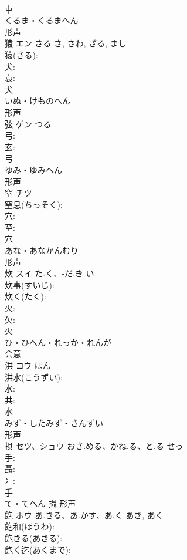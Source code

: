 \documentclass[8pt]{extreport}
\begin{document}
\begin{CJK}{UTF8}{min}
\\	車	
\\	くるま・くるまへん	
\\	形声 
\\	猿	エン	さる	さ, さわ, ざる, まし	
\\	猿(さる): 
\\	犬: 
\\	袁: 
\\	犬	
\\	いぬ・けものへん	
\\	形声 
\\	弦	ゲン	つる		
\\	弓: 
\\	玄: 
\\	弓	
\\	ゆみ・ゆみへん	
\\	形声 
\\	窒	チツ			
\\	窒息(ちっそく): 
\\	穴: 
\\	至: 
\\	穴	
\\	あな・あなかんむり	
\\	形声 
\\	炊	スイ	た.く、-だ.き	い	
\\	炊事(すいじ): 
\\	炊く(たく): 
\\	火: 
\\	欠: 
\\	火	
\\	ひ・ひへん・れっか・れんが	
\\	会意 
\\	洪	コウ		ほん	
\\	洪水(こうずい): 
\\	水: 
\\	共: 
\\	水	
\\	みず・したみず・さんずい	
\\	形声 
\\	摂	セツ、ショウ	おさ.める、かね.る、と.る	せっ	
\\	手: 
\\	聶: 
\\	冫: 
\\	手	
\\	て・てへん	攝	形声 
\\	飽	ホウ	あ.きる、あ.かす、あ.く	あき, あく	
\\	飽和(ほうわ): 
\\	飽きる(あきる): 
\\	飽く迄(あくまで): 

\end{CJK}
\end{document}
